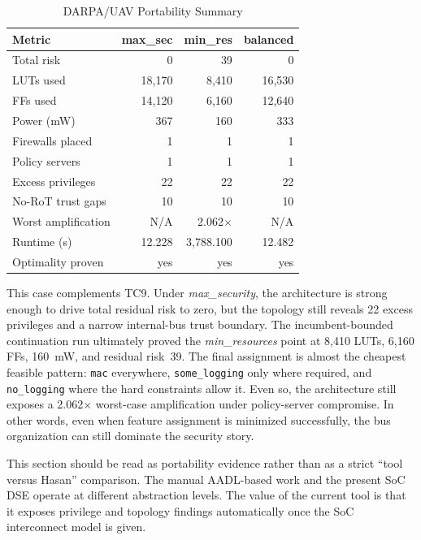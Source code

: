 \documentclass[conference]{IEEEtran}
\begin{document}
\begin{table}[t]
\caption{DARPA/UAV Portability Summary}
\label{tab:uav}
\centering
\scriptsize
\begin{tabular}{lrrr}
\toprule
Metric & max\_sec & min\_res & balanced \\
\midrule
Total risk         & 0      & 39     & 0 \\
LUTs used          & 18,170 & 8,410  & 16,530 \\
FFs used           & 14,120 & 6,160  & 12,640 \\
Power (mW)         & 367    & 160    & 333 \\
Firewalls placed   & 1      & 1      & 1 \\
Policy servers     & 1      & 1      & 1 \\
Excess privileges  & 22     & 22     & 22 \\
No-RoT trust gaps  & 10     & 10     & 10 \\
Worst amplification& N/A    & 2.062$\times$ & N/A \\
Runtime (s)        & 12.228 & 3,788.100 & 12.482 \\
Optimality proven  & yes    & yes    & yes \\
\bottomrule
\end{tabular}
\end{table}

This case complements TC9. Under \textit{max\_security}, the architecture is
strong enough to drive total residual risk to zero, but the topology still
reveals 22 excess privileges and a narrow internal-bus trust boundary. The
incumbent-bounded continuation run ultimately proved the
\textit{min\_resources} point at 8,410 LUTs, 6,160 FFs, 160~mW, and residual
risk~39. The final assignment is almost the cheapest feasible pattern:
\texttt{mac} everywhere, \texttt{some\_logging} only where required, and
\texttt{no\_logging} where the hard constraints allow it. Even so, the
architecture still exposes a 2.062$\times$ worst-case amplification under
policy-server compromise. In other words, even when feature assignment is
minimized successfully, the bus organization can still dominate the security
story.

This section should be read as portability evidence rather than as a strict
``tool versus Hasan'' comparison. The manual AADL-based work and the present
SoC DSE operate at different abstraction levels. The value of the current
tool is that it exposes privilege and topology findings automatically once
the SoC interconnect model is given.
\end{document}
